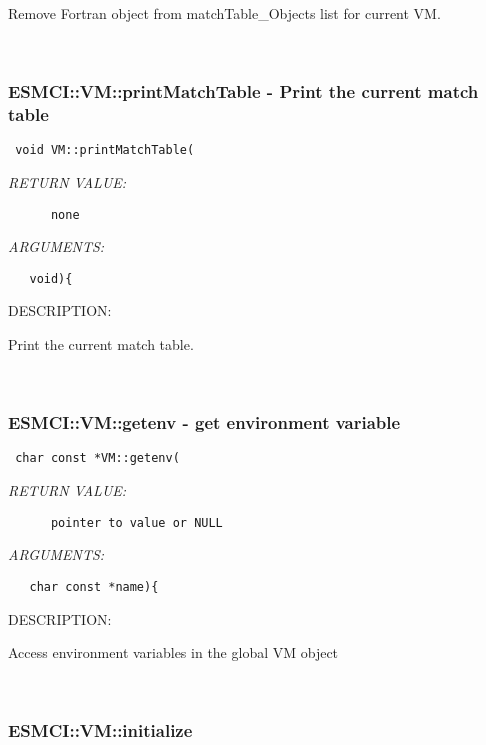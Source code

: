 {      Remove Fortran object from matchTable_Objects list for current VM.
   
 
\mbox{}\hrulefill\
 
\subsubsection [ESMCI::VM::printMatchTable] {ESMCI::VM::printMatchTable - Print the current match table}


  
\begin{verbatim} void VM::printMatchTable(\end{verbatim}{\em RETURN VALUE:}
\begin{verbatim}      none\end{verbatim}{\em ARGUMENTS:}
\begin{verbatim}   void){\end{verbatim}
{\sf DESCRIPTION:\\ }


      Print the current match table.
   
 
\mbox{}\hrulefill\
 
\subsubsection [ESMCI::VM::getenv] {ESMCI::VM::getenv - get environment variable}


\begin{verbatim} char const *VM::getenv(\end{verbatim}{\em RETURN VALUE:}
\begin{verbatim}      pointer to value or NULL\end{verbatim}{\em ARGUMENTS:}
\begin{verbatim}   char const *name){\end{verbatim}
{\sf DESCRIPTION:\\ }


      Access environment variables in the global VM object
   
 
\mbox{}\hrulefill\
 
\subsubsection [ESMCI::VM::initialize] {ESMCI::VM::initialize}


}
